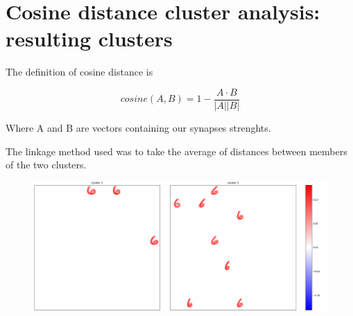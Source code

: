 \documentclass[a4paper]{report}
\begin{document}
\chapter{Cosine distance cluster analysis: resulting clusters}

The definition of cosine distance is

\begin{equation}
    cosine(A,B) = 1 - \frac{A \cdot B}{|A||B|}
\end{equation}

Where A and B are vectors containing our synapses strenghts.

The linkage method used was to take the average of distances between members of the two clusters.

\begin{figure} [H]
    \centering
    \includegraphics [width=\textwidth ] {c/c/1.png}
    \caption{}
\end{figure}
\end{document}
